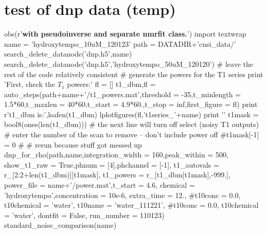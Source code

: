 \section{test of dnp data (temp)}
\begin{tiny}
\begin{python}[off]
obs(r'{\bf with pseudoinverse and separate nmrfit class.}')
import textwrap
name = 'hydroxytempo_10uM_120123'
path = DATADIR+'cnsi_data/'
search_delete_datanode('dnp.h5',name)
search_delete_datanode('dnp.h5','hydroxytempo_50uM_120120')
# leave the rest of the code relatively consistent
#{{{ generate the powers for the T1 series
print 'First, check the $T_1$ powers:\n\n'
fl = []
t1_dbm,fl = auto_steps(path+name+'/t1_powers.mat',threshold = -35,t_minlength = 1.5*60,t_maxlen = 40*60,t_start = 4.9*60.,t_stop = inf,first_figure = fl)
print r't1\_dbm is:',lsafen(t1_dbm)
lplotfigures(fl,'t1series_'+name)
print '\n\n'
t1mask = bool8(ones(len(t1_dbm)))
# the next line will turn off select (noisy T1 outputs)
# enter the number of the scan to remove -- don't include power off
#t1mask[-1] = 0
#}}}
# rerun because stuff got messed up
dnp_for_rho(path,name,integration_width = 160,peak_within = 500,
        show_t1_raw = True,phnum = [4],phchannel = [-1],
        t1_autovals = r_[2:2+len(t1_dbm)][t1mask],
        t1_powers = r_[t1_dbm[t1mask],-999.],
        power_file = name+'/power.mat',t_start = 4.6,
        chemical = 'hydroxytempo',concentration = 10e-6,
        extra_time = 12., #t10conc = 0.0, t10chemical = 'water',
        t10name = 'water_111221', #t10conc = 0.0, t10chemical = 'water',
        dontfit = False, run_number = 110123)
standard_noise_comparison(name)
\end{python}
\end{tiny}
